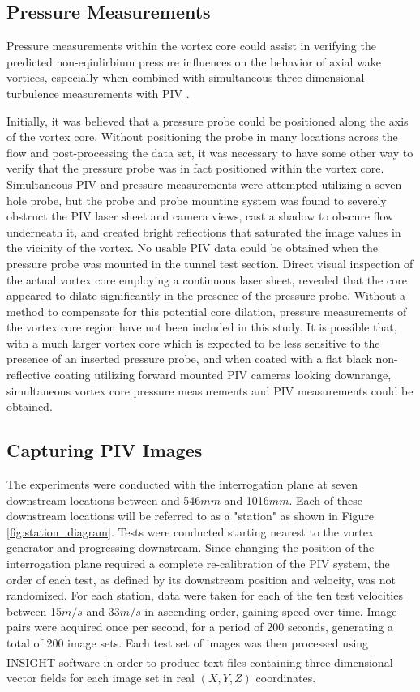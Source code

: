 \subsection{Pressure Measurements}

Pressure measurements within the vortex core could assist in verifying the 
predicted non-eqiulirbium pressure influences on the behavior of axial wake 
vortices, especially when combined with simultaneous three dimensional 
turbulence measurements with PIV \cite{ash2011}.


Initially, it was believed that a pressure probe could be positioned 
along the axis of the vortex core. Without positioning the probe in many 
locations across the flow and post-processing the data set, it was necessary to 
have some other way to verify that the pressure probe was in fact positioned 
within the vortex core. Simultaneous PIV and pressure measurements were 
attempted utilizing a seven hole probe, but the probe and probe mounting system 
was found to severely obstruct the PIV laser sheet and camera views, cast a 
shadow to obscure flow underneath it, and 
created bright reflections that saturated the image values in the vicinity of 
the vortex. No usable PIV data could be obtained when the pressure probe was 
mounted in the tunnel test section. Direct visual inspection of the actual 
vortex core employing a continuous laser sheet, revealed that the core appeared 
to dilate significantly in the presence of the pressure probe. Without a method 
to compensate for this potential core dilation, pressure measurements of the 
vortex core region have not been included in this study. It is possible that, 
with a much larger vortex core which is expected to be less 
sensitive to the presence of an inserted pressure probe, and when coated with 
a flat black non-reflective coating utilizing forward mounted PIV cameras 
looking downrange, simultaneous vortex core pressure measurements and PIV 
measurements could be obtained.

\subsection{Capturing PIV Images}

The experiments were conducted with the interrogation plane at seven 
downstream  locations between and 546$mm$ and 1016$mm$. Each of these 
downstream locations will be referred to as a "station" as shown in Figure 
\ref{fig:station_diagram}. Tests were conducted 
starting nearest to the vortex 
generator and progressing downstream. Since changing the position of the 
interrogation plane required a complete re-calibration of the PIV system, the 
order of each test, as defined by its downstream position and velocity, was not 
randomized. For each station, data were taken for each of 
the ten test velocities between 15$m/s$ and 33$m/s$ in ascending order, gaining 
speed over time. Image pairs were acquired once per second, for a period of 200 
seconds, generating a total of 200 image sets. Each test set of images was then 
processed using INSIGHT\textsuperscript{\textcopyright} software in 
order to produce text files containing three-dimensional vector fields for each 
image set in real $(X, Y, Z)$ coordinates.

